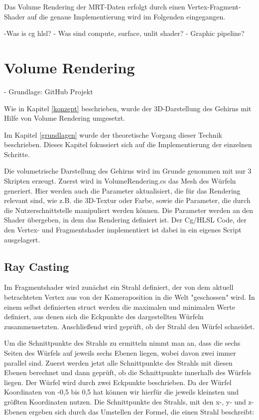 Das Volume Rendering der MRT-Daten erfolgt durch einen Vertex-Fragment-Shader auf die genaue Implementierung wird im Folgenden eingegangen. 

-Was is cg hlsl?
- Was sind compute, surface, unlit shader?
- Graphic pipeline?


\section{Volume Rendering}
- Grundlage: GitHub Projekt
\citet{volumeRenderingGit}

Wie in Kapitel \ref{konzept} beschrieben, wurde der 3D-Darstellung des Gehirns mit Hilfe von Volume Rendering umgesetzt. 

Im Kapitel \ref{grundlagen} wurde der theoretische Vorgang dieser Technik beschrieben. Dieses Kapitel fokussiert sich auf die Implementierung der einzelnen Schritte.

Die volumetrische Darstellung des Gehirns wird im Grunde genommen mit nur 3 Skripten erzeugt. Zuerst wird in VolumeRendering.cs das Mesh des Würfeln generiert. Hier werden auch die Parameter aktualisiert, die für das Rendering relevant sind, wie z.B. die 3D-Textur oder Farbe, sowie die Parameter, die durch die Nutzerschnittstelle manipuliert werden können. 
Die Parameter werden an den Shader übergeben, in dem das Rendering definiert ist. Der Cg/HLSL Code, der den Vertex- und Fragmentshader implementiert ist dabei in ein eigenes Script ausgelagert.

\subsection{Ray Casting}

Im Fragmentshader wird zunächst ein Strahl definiert, der von dem aktuell betrachteten Vertex aus von der Kameraposition in die Welt "geschossen" wird. In einem selbst definierten struct werden die maximalen und minimalen Werte definiert, aus denen sich die Eckpunkte des dargestellten Würfeln zusammensetzten. Anschließend wird geprüft, ob der Strahl den Würfel schneidet. 

Um die Schnittpunkte des Strahls zu ermitteln nimmt man an, dass die sechs Seiten des Würfels auf jeweils sechs Ebenen liegen, wobei davon zwei immer parallel sind. Zuerst werden jetzt alle Schnittpunkte des Strahls mit diesen Ebenen berechnet und dann geprüft, ob die Schnittpunkte innerhalb des Würfels liegen.
Der Würfel wird durch zwei Eckpunkte beschrieben. Da der Würfel Koordinaten von -0,5 bis 0,5 hat können wir hierfür die jeweils kleinsten und größten Koordinaten nutzen. 
Die Schnittpunkte des Strahls, mit den x-, y- und z-Ebenen ergeben sich durch das Umstellen der Formel, die einen Strahl beschreibt:


